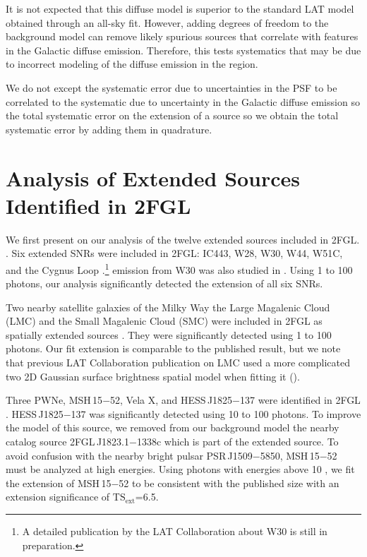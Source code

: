 \documentclass[12pt,preprint]{aastex}
\newcommand{\gev}{\text{GeV}\xspace}
\newcommand{\tsext}{{\ensuremath{\text{TS}_{\text{ext}}}}\xspace}
\begin{document}
It is not expected that this diffuse model is superior to the standard
LAT model obtained through an all-sky fit.  However, adding degrees of freedom to the background model can
remove likely spurious sources that correlate with features in the
Galactic diffuse emission.  Therefore, this tests systematics that may
be due to incorrect modeling of the diffuse emission in the region.

We do not except the systematic error due to uncertainties in the PSF to
be correlated to the systematic due to uncertainty in the Galactic diffuse
emission so the total systematic error on the extension of a source so
we obtain the total systematic error by adding them in quadrature.

\section{Analysis of Extended Sources Identified in 2FGL}
\label{validate_known}


We first present on our analysis of the twelve extended sources
included in 2FGL.
\citep{second_cat}.
Six extended SNRs were included in 2FGL: IC443, W28, W30, W44, W51C, and the
Cygnus Loop \citep{ic443,w28,w44,w51c,cygnus_loop_lat}.\footnote{A
detailed publication by the LAT
Collaboration about W30 is still in preparation.}
\gev emission from W30 was also studied in \cite{castro_and_slane_2010}.
Using 1 \gev to 100 \gev photons, our analysis significantly detected the
extension of all six SNRs.

Two nearby satellite galaxies of the Milky Way the Large Magalenic Cloud (LMC)
and the Small Magalenic
Cloud (SMC) were included in 2FGL as spatially extended sources \citep{lmc,smc}.  They were significantly
detected using 1 \gev to 100 \gev photons. Our
fit extension is comparable to the published result, but we note that
previous LAT Collaboration publication on LMC used a more complicated two 2D Gaussian surface
brightness spatial model when fitting it (\citep{lmc}).

Three PWNe, MSH\,15$-$52, Vela X, and HESS\,J1825$-$137 were
identified in 2FGL \citep{msh1552,velax,fermi_hess_j1825}.  
HESS\,J1825$-$137 was significantly detected using 10 \gev to 100 \gev photons.
To improve the model of this source, we removed from our background model the
nearby catalog source 2FGL\,J1823.1$-$1338c which is part of the extended
source.  To avoid confusion with the nearby bright pulsar PSR\,J1509$-$5850, MSH\,15$-$52 must be
analyzed at high energies.  Using photons with energies above 10 \gev,
we fit the extension of MSH\,15$-$52 to be consistent with the published
size with an extension significance of \tsext=6.5.  
\end{document}
